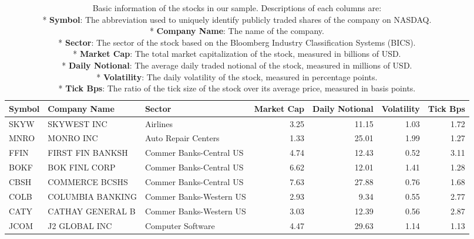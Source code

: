 \begin{table}
\centering
\caption{Basic information of the stocks in our sample. Descriptions of each columns are: \\
 * \textbf{Symbol}: The abbreviation used to uniquely identify publicly traded shares of the company on NASDAQ. \\
 * \textbf{Company Name}: The name of the company. \\
 * \textbf{Sector}: The sector of the stock based on the Bloomberg Industry Classification Systems (BICS). \\
 * \textbf{Market Cap}: The total market capitalization of the stock, measured in billions of USD. \\
 * \textbf{Daily Notional}: The average daily traded notional of the stock, measured in millions of USD. \\
 * \textbf{Volatility}: The daily volatility of the stock, measured in percentage points. \\
 * \textbf{Tick Bps}: The ratio of the tick size of the stock over its average price, measured in basis points.\\
}
\label{table:stockBasicsTable}
\begin{tabular}{lllrrrr}
\toprule
Symbol &      Company Name &                       Sector &  Market Cap &  Daily Notional &  Volatility &  Tick Bps \\
\midrule
  SKYW &       SKYWEST INC &                     Airlines &        3.25 &           11.15 &        1.03 &      1.72 \\
  MNRO &         MONRO INC &          Auto Repair Centers &        1.33 &           25.01 &        1.99 &      1.27 \\
  FFIN &  FIRST FIN BANKSH &      Commer Banks-Central US &        4.74 &           12.43 &        0.52 &      3.11 \\
  BOKF &     BOK FINL CORP &      Commer Banks-Central US &        6.62 &           12.01 &        1.41 &      1.28 \\
  CBSH &    COMMERCE BCSHS &      Commer Banks-Central US &        7.63 &           27.88 &        0.76 &      1.68 \\
  COLB &  COLUMBIA BANKING &      Commer Banks-Western US &        2.93 &            9.34 &        0.55 &      2.77 \\
  CATY &  CATHAY GENERAL B &      Commer Banks-Western US &        3.03 &           12.39 &        0.56 &      2.87 \\
  JCOM &     J2 GLOBAL INC &            Computer Software &        4.47 &           29.63 &        1.14 &      1.13 \\

\end{tabular}
\end{table}
